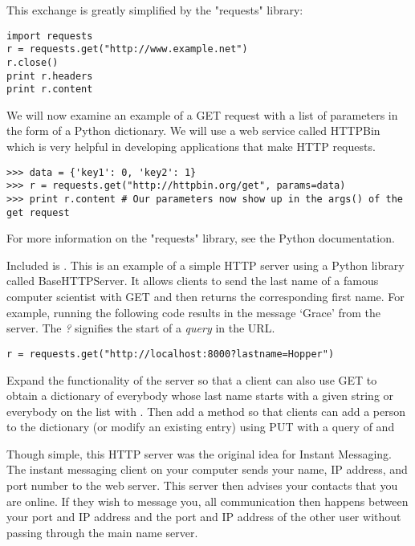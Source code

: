 This exchange is greatly simplified by the "requests" library:
\begin{lstlisting}
import requests
r = requests.get("http://www.example.net")
r.close()
print r.headers
print r.content
\end{lstlisting}

We will now examine an example of a GET request with a list of parameters in the form of a Python dictionary.
We will use a web service called HTTPBin which is very helpful in developing applications that make HTTP requests.
\begin{lstlisting}
>>> data = {'key1': 0, 'key2': 1}
>>> r = requests.get("http://httpbin.org/get", params=data)
>>> print r.content # Our parameters now show up in the args() of the get request
\end{lstlisting}

For more information on the "requests" library, see the Python documentation.
%
\begin{problem}
Included is . This is an example of a simple HTTP server using a Python library called BaseHTTPServer. It allows clients to send the last name of a famous computer scientist with GET and then returns the corresponding first name. For example, running the following code results in the message `Grace' from the server. The \textit{?} signifies the start of a \textit{query} in the URL.

\begin{lstlisting}
r = requests.get("http://localhost:8000?lastname=Hopper")
\end{lstlisting}

Expand the functionality of the server so that a client can also use GET to obtain a dictionary of everybody whose last name starts with a given string or everybody on the list with . Then add a method so that clients can add a person to the dictionary (or modify an existing entry) using PUT with a query of  and 
\end{problem}

Though simple, this HTTP server was the original idea for Instant Messaging.
The instant messaging client on your computer sends your name, IP address, and port number to the web server.
This server then advises your contacts that you are online. 
If they wish to message you, all communication then happens between your port and IP address and the port and IP address of the other user without passing through the main name server.

